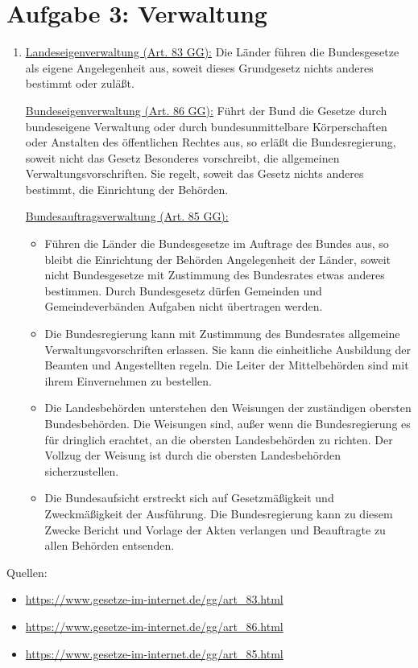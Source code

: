 \documentclass{article}
\begin{document}
	\section*{Aufgabe 3: Verwaltung}
	\begin{enumerate}[label=(\alph*)]
		\item\underline{Landeseigenverwaltung (Art. 83 GG):} Die Länder führen die Bundesgesetze als eigene Angelegenheit aus, soweit dieses Grundgesetz nichts anderes bestimmt oder zuläßt.
		
		\underline{Bundeseigenverwaltung (Art. 86 GG):} Führt der Bund die Gesetze durch bundeseigene Verwaltung oder durch bundesunmittelbare Körperschaften oder Anstalten des öffentlichen Rechtes aus, so erläßt die Bundesregierung, soweit nicht das Gesetz Besonderes vorschreibt, die allgemeinen Verwaltungsvor\-schriften. Sie regelt, soweit das Gesetz nichts anderes bestimmt, die Einrichtung der Behörden.
		
		\underline{Bundesauftragsverwaltung (Art. 85 GG):}
		\begin{itemize}
			\item Führen die Länder die Bundesgesetze im Auftrage des Bundes aus, so bleibt die Einrichtung der Behörden Angelegenheit der Länder, soweit nicht Bundesgesetze mit Zustimmung des Bundesrates etwas anderes bestimmen. Durch Bundesgesetz dürfen Gemeinden und Gemeindeverbänden Aufgaben nicht übertragen werden.
			\item Die Bundesregierung kann mit Zustimmung des Bundesrates allgemeine Verwaltungsvorschriften erlassen. Sie kann die einheitliche Ausbildung der Beamten und Angestellten regeln. Die Leiter der Mittelbehörden sind mit ihrem Einvernehmen zu bestellen.
			\item Die Landesbehörden unterstehen den Weisungen der zuständigen obersten Bundesbehörden. Die Weisungen sind, außer wenn die Bundesregierung es für dringlich erachtet, an die obersten Landesbehörden zu richten. Der Vollzug der Weisung ist durch die obersten Landesbehörden sicherzustellen.
			\item Die Bundesaufsicht erstreckt sich auf Gesetzmäßigkeit und Zweckmäßigkeit der Ausführung. Die Bundesregierung kann zu diesem Zwecke Bericht und Vorlage der Akten verlangen und Beauftragte zu allen Behörden entsenden.
		\end{itemize}
	\end{enumerate}

	Quellen:
	\begin{itemize}
		\item \url{https://www.gesetze-im-internet.de/gg/art_83.html}
		\item \url{https://www.gesetze-im-internet.de/gg/art_86.html}
		\item \url{https://www.gesetze-im-internet.de/gg/art_85.html}
	\end{itemize}
\end{document}
